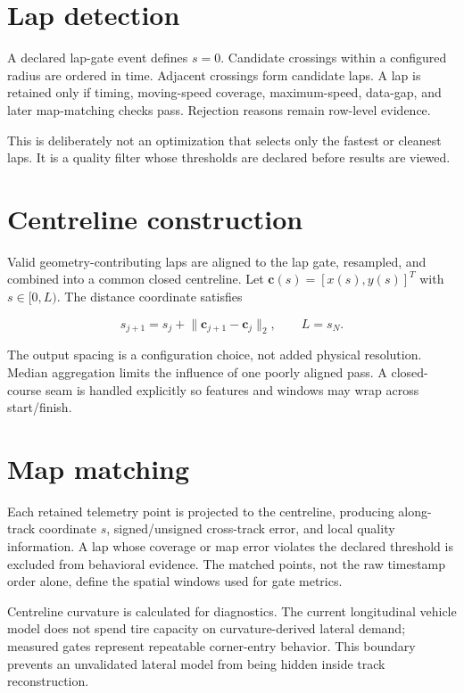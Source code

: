\documentclass[11pt,oneside]{report}
\begin{document}
\section{Lap detection}

A declared lap-gate event defines $s=0$.  Candidate crossings within a configured
radius are ordered in time.  Adjacent crossings form candidate laps.  A lap is retained
only if timing, moving-speed coverage, maximum-speed, data-gap, and later map-matching
checks pass.  Rejection reasons remain row-level evidence.

This is deliberately not an optimization that selects only the fastest or cleanest
laps.  It is a quality filter whose thresholds are declared before results are viewed.

\section{Centreline construction}

Valid geometry-contributing laps are aligned to the lap gate, resampled, and combined
into a common closed centreline.  Let $\mathbf{c}(s)=[x(s),y(s)]^T$ with
$s\in[0,L)$.  The distance coordinate satisfies

\begin{equation}
s_{j+1}=s_j+\lVert \mathbf{c}_{j+1}-\mathbf{c}_j\rVert_2,
\qquad L=s_{N}.
\end{equation}

The output spacing is a configuration choice, not added physical resolution.  Median
aggregation limits the influence of one poorly aligned pass.  A closed-course seam is
handled explicitly so features and windows may wrap across start/finish.

\section{Map matching}

Each retained telemetry point is projected to the centreline, producing along-track coordinate
$s$, signed/unsigned cross-track error, and local quality information.  A lap whose
coverage or map error violates the declared threshold is excluded from behavioral
evidence.  The matched points, not the raw timestamp order alone, define the spatial
windows used for gate metrics.

Centreline curvature is calculated for diagnostics.  The current longitudinal vehicle
model does not spend tire capacity on curvature-derived lateral demand; measured gates
represent repeatable corner-entry behavior.  This boundary prevents an unvalidated
lateral model from being hidden inside track reconstruction.
\end{document}
